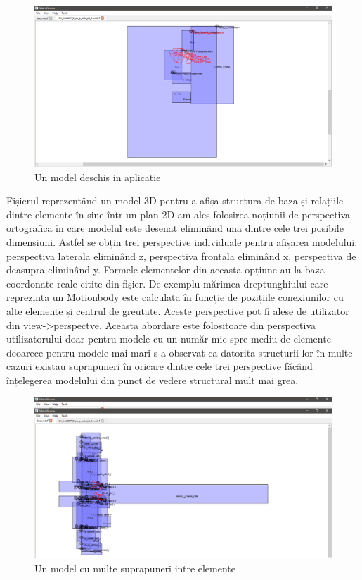 \begin{figure}[h]
    \includegraphics[width=\linewidth]{imagini/implementare/tabs.png}
    \caption{Un model deschis in aplicatie}
    \label{fig:tabs}
\end{figure}

Fișierul reprezentând un model 3D pentru a afișa structura de baza și relațiile dintre elemente 
în sine într-un plan 2D am ales folosirea noțiunii de perspectiva ortografica în care modelul este desenat eliminând 
una dintre cele trei posibile dimensiuni. Astfel se obțin trei perspective individuale pentru afișarea modelului: 
perspectiva laterala eliminând z, perspectiva frontala eliminând x, perspectiva de deasupra eliminând y. Formele 
elementelor din aceasta opțiune au la baza coordonate reale citite din fișier. De exemplu mărimea dreptunghiului 
care reprezinta un Motionbody este calculata în funcție de pozițiile conexiunilor cu alte elemente și centrul de 
greutate. Aceste perspective pot fi alese de utilizator din view->perspectve. Aceasta abordare este folositoare din 
perspectiva utilizatorului doar pentru modele cu un număr mic spre mediu de elemente deoarece pentru modele mai mari 
s-a observat ca datorita structurii lor în multe cazuri existau suprapuneri în oricare dintre cele trei perspective 
făcând înțelegerea modelului din punct de vedere structural mult mai grea.\newline 

\begin{figure}[h]
    \includegraphics[width=\linewidth]{imagini/implementare/overlapping.png}
    \caption{Un model cu multe suprapuneri intre elemente}
    \label{fig:tabs}
\end{figure}

